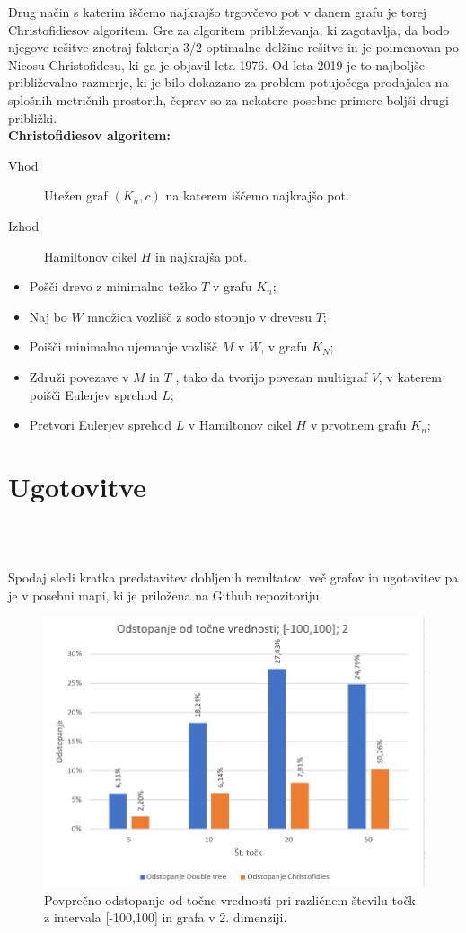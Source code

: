\documentclass[12pt,a4paper]{amsart}
\theoremstyle{definition} %
\theoremstyle{plain} %
\begin{document}
Drug način s katerim iščemo najkrajšo trgovčevo pot v danem grafu je torej Christofidiesov algoritem.
Gre za algoritem približevanja, ki zagotavlja, da bodo njegove rešitve znotraj faktorja 3/2 optimalne dolžine rešitve in je poimenovan po Nicosu Christofidesu, ki ga je objavil leta 1976.
Od leta 2019 je to najboljše približevalno razmerje, ki je bilo dokazano za problem potujočega prodajalca na splošnih metričnih prostorih, čeprav so za nekatere posebne primere boljši drugi približki. \\

\textbf{Christofidiesov algoritem:}
\begin{description}
 \item[Vhod] Utežen graf $(K_n,c)$ na katerem iščemo najkrajšo pot.
 \item[Izhod] Hamiltonov cikel $H$ in najkrajša pot.
\end{description}
\begin{itemize}
\item Pošči drevo z minimalno težko $T$ v grafu $K_n$;
\item Naj bo $W$ množica vozlišč z sodo stopnjo v drevesu $T$;
\item Poišči minimalno ujemanje vozlišč $M$ v $W$, v grafu $K_N$;
\item Združi povezave v $M$ in $T$ , tako da tvorijo povezan multigraf $V$, v katerem poišči Eulerjev sprehod $L$;
\item Pretvori Eulerjev sprehod $L$ v Hamiltonov cikel $H$ v prvotnem grafu $K_n$;
\end{itemize}

\newpage
\section{Ugotovitve} \hfill\\\

Spodaj sledi kratka predstavitev dobljenih rezultatov, več grafov in ugotovitev pa je v posebni mapi, ki je priložena na Github repozitoriju.
\\
\begin{figure}[h!]
  \centering
    \includegraphics[width=\linewidth]{OdstopanjeOverall.PNG}
    \caption{Povprečno odstopanje od točne vrednosti pri različnem številu točk z intervala [-100,100] in grafa v 2. dimenziji.}
\end{figure}
\end{document}
